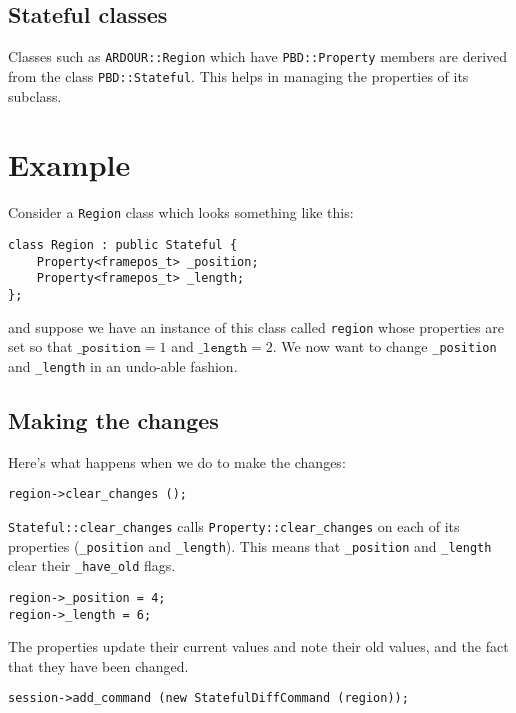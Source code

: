 \documentclass[10pt,a4paper]{book}
\newcommand{\code}[1]{\texttt{#1}}
\begin{document}
\subsection{Stateful classes}

Classes such as \code{ARDOUR::Region} which have \code{PBD::Property}
members are derived from the class \code{PBD::Stateful}.  This helps
in managing the properties of its subclass.

\section{Example}

Consider a \code{Region} class which looks something like this:

\begin{lstlisting}
class Region : public Stateful {
    Property<framepos_t> _position;
    Property<framepos_t> _length;
};
\end{lstlisting}

and suppose we have an instance of this class called \code{region}
whose properties are set so that $\code{\_position} = 1$ and
$\code{\_length} = 2$.  We now want to change \code{\_position} and
\code{\_length} in an undo-able fashion.

\subsection{Making the changes}

Here's what happens when we do to make the changes:

\begin{lstlisting}
region->clear_changes ();
\end{lstlisting}

\code{Stateful::clear\_changes} calls \code{Property::clear\_changes}
on each of its properties (\code{\_position} and \code{\_length}).
This means that \code{\_position} and \code{\_length} clear their
\code{\_have\_old} flags.

\begin{lstlisting}
region->_position = 4;
region->_length = 6;
\end{lstlisting}

The properties update their current values and note their old values,
and the fact that they have been changed.

\begin{lstlisting}
session->add_command (new StatefulDiffCommand (region));
\end{lstlisting}
\end{document}
